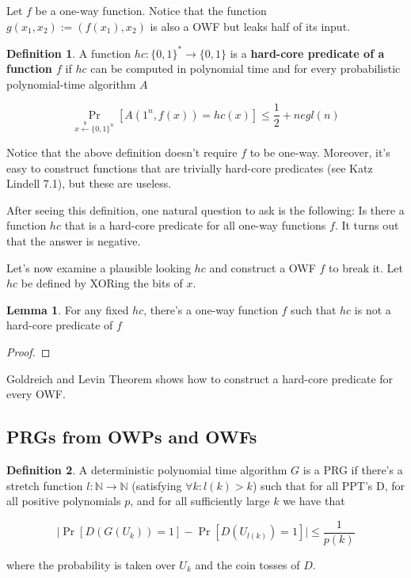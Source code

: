 \documentclass{article}
\theoremstyle{definition}
\newtheorem{definition}{Definition}
\newtheorem{lemma}[theorem]{Lemma}
\newcommand{\N}{\mathbb{N}}
\newcommand{\bitstring}[1]{\{0,1\}^{#1}}
\begin{document}
Let $f$ be a one-way function. Notice that the function $g(x_{1},x_{2}) := (f(x_{1}),x_{2})$
is also a OWF but leaks half of its input.

\begin{definition}
    A function $hc: \bitstring{*} \xrightarrow{} \{0,1\}$ is a \textbf{hard-core predicate of a function $f$}
    if $hc$ can be computed in polynomial time and for every probabilistic polynomial-time algorithm $A$

    \[ \Pr_{x \xleftarrow{\$} \bitstring{n}}[A(1^{n},f(x)) = hc(x)] \leq \frac{1}{2} + negl(n)\]
\end{definition}

Notice that the above definition doesn't require $f$ to be one-way. Moreover, it's easy to construct
functions that are trivially hard-core predicates (see Katz Lindell 7.1), but these are useless.

After seeing this definition, one natural question to ask is the following:
Is there a function $hc$ that is a hard-core predicate for all one-way functions $f$.
It turns out that the answer is negative.

Let's now examine a plausible looking $hc$ and construct a OWF $f$ to break it.
Let $hc$ be defined by XORing the bits of $x$.

\begin{lemma}
    For any fixed $hc$, there's a one-way function $f$ such that 
    $hc$ is not a hard-core predicate of $f$
\end{lemma}
\begin{proof}
    
\end{proof}

Goldreich and Levin Theorem shows how to construct a hard-core predicate
for every OWF.

\subsection{PRGs from OWPs and OWFs}

\begin{definition}
    A deterministic polynomial time algorithm $G$ is a PRG if there's 
    a stretch function $l: \N \xrightarrow{} \N$ (satisfying $\forall k: l(k) > k$)
    such that for all PPT's D, for all positive polynomials $p$, and for all
    sufficiently large $k$ we have that 

    \[ \lvert \Pr[D(G(U_{k})) = 1] - \Pr[D(U_{l(k)}) = 1] \rvert \leq \frac{1}{p(k)}\]

    where the probability is taken over $U_{k}$ and the coin tosses of $D$.
\end{definition}
\end{document}
